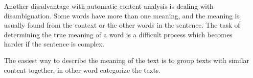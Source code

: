 Another disadvantage with automatic content analysis is dealing with disambiguation. Some words have more than one meaning, and the meaning is usually found from the context or the other words in the sentence. The task of determining the true meaning of a word is a difficult process which becomes harder if the sentence is complex. 

The easiest way to describe the meaning of the text is to group texts with similar content together, in other word categorize the texts. 




